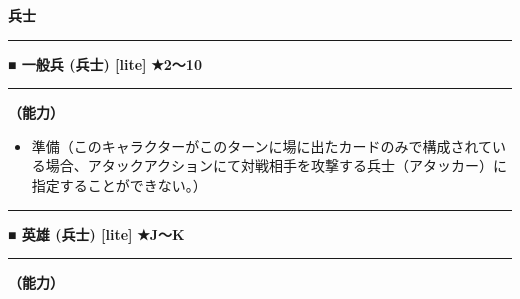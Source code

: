 \documentclass[twocolumn,a5paper,papersize,10pt]{jarticle}
\begin{document}
\begin{tcolorbox}
{\scriptsize\bf 兵士}
\end{tcolorbox}
\vspace{-1zh}%
\vspace{2mm} %
\hrule height 0.5mm depth 0mm width 66.5mm %
\vspace{1mm} %
{\normalsize\bf ■ 一般兵 {\scriptsize (兵士) [lite]}} %
\hfill 
{\small\bf ★2〜10 }

\vspace{1mm}%
\hrule height 0.1mm depth 0mm width 66.5mm %
\vspace{1mm}%

{\bf（能力）}


\vspace{-1zh}%
\begin{itemize}
\setlength{\leftskip}{-0.3cm}
\setlength{\parskip}{0pt} %

\item 準備（このキャラクターがこのターンに場に出たカードのみで構成されている場合、アタックアクションにて対戦相手を攻撃する兵士（アタッカー）に指定することができない。）
\vspace{-1zh}%
\end{itemize}
\vspace{2mm} %
\hrule height 0.5mm depth 0mm width 66.5mm %
\vspace{1mm} %
{\normalsize\bf ■ 英雄 {\scriptsize (兵士) [lite]}} %
\hfill 
{\small\bf ★J〜K }

\vspace{1mm}%
\hrule height 0.1mm depth 0mm width 66.5mm %
\vspace{1mm}%

{\bf（能力）}
\end{document}
